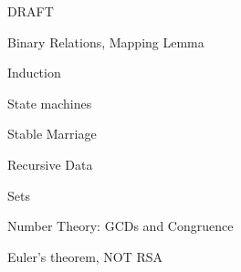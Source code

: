 \documentclass[quiz]{mcs}
\begin{document}


\examspace

\begin{center}
{\Large DRAFT}
\end{center}

\begin{center}
{\large Binary Relations, Mapping Lemma}
\end{center}

\begin{center}
{\large Induction}
\end{center}

\begin{center}
{\large State machines}
\end{center}

\begin{center}
{\large Stable Marriage}
\end{center}

\begin{center}
{\large Recursive Data}
\end{center}

\begin{center}
{\large Sets}
\end{center}

\begin{center}
{\large Number Theory: GCDs and Congruence}
\end{center}

\begin{center}
{\large Euler's theorem, NOT RSA}
\end{center}

\end{document}
